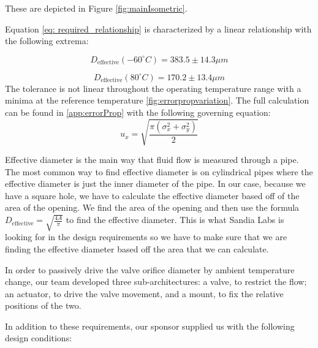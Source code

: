 \documentclass[12pt, letterpaper]{report}%
\newcounter{mycounter}           %
\newcounter{sub}[mycounter]      %
\newcommand{\degC}{^{\circ}C}    %
\newcommand{\coldBoundary}{D_{\text{effective}}(-60\degC) = 383.5 \pm 14.3 \mu m}
\newcommand{\hotBoundary}{D_{\text{effective}}(80\degC) = 170.2 \pm 13.4 \mu m}
\newcommand{\govErrorProp}{u_x = \sqrt{\frac{\pi(\sigma_x^2+\sigma_y^2)}{2}}}
\begin{document}
        These are depicted in Figure \ref{fig:mainIsometric}.

        Equation \eqref{eq: required_relationship} is characterized by a linear relationship with the following extrema:

        \begin{equation}
            \coldBoundary
            \label{eq: coldBoundary}
        \end{equation}
        
        \begin{equation}
            \hotBoundary
            \label{eq: hotBoundary}
        \end{equation}
        The tolerance is not linear throughout the operating temperature range with a minima at the reference temperature \ref{fig:errorpropvariation}.
        The full calculation can be found in \ref{app:errorProp} with the following governing equation:
        \begin{equation}
            \govErrorProp
            \label{eq:ErrorPropagation}
        \end{equation}


        Effective diameter is the main way that fluid flow is measured through a pipe. The most 
        common way to find effective diameter is on cylindrical pipes where the effective diameter is just the inner 
        diameter of the pipe. In our case, because we have a square hole, we have to calculate the effective diameter based 
        off of the area of the opening. We find the area of the opening and then use the formula $D_{\text{effective}}=\sqrt{\frac{4A}{\pi}}$ 
        to find the effective diameter. This is what Sandia Labs is looking for in the design requirements so we have to make
        sure that we are finding the effective diameter based off the area that we can calculate.

        In order to passively drive the valve orifice diameter by ambient temperature change, 
        our team developed three sub-architectures:
        a valve, to restrict the flow;
        an actuator, to drive the valve movement,
        and a mount, to fix the relative positions of the two.

        In addition to these requirements, our sponsor supplied us with the following design conditions:
        
\end{document}
